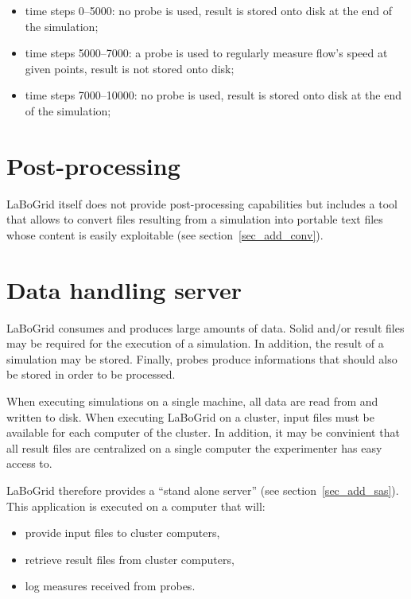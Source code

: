 \begin{itemize}
\setlength{\itemsep}{0ex}
	\item time steps 0--5000: no probe is used, result is stored onto disk at the
	end of the simulation;
	\item time steps 5000--7000: a probe is used to regularly measure flow's
	speed at given points, result is not stored onto disk;
	\item time steps 7000--10000: no probe is used, result is stored onto disk at
	the end of the simulation;
\end{itemize}


\section{Post-processing}

LaBoGrid itself does not provide post-processing capabilities but includes a
tool that allows to convert files resulting from a simulation into portable text
files whose content is easily exploitable (see section~\ref{sec_add_conv}).


\section{Data handling server}
\label{sec_feat_stand}

LaBoGrid consumes and produces large amounts of data. Solid and/or result files
may be required for the execution of a simulation. In addition, the result of a
simulation may be stored. Finally, probes produce informations that should also
be stored in order to be processed.

When executing simulations on a single machine, all data are read from and
written to disk. When executing LaBoGrid on a cluster, input files must be
available for each computer of the cluster. In addition, it may be convinient
that all result files are centralized on a single computer the experimenter has
easy access to.

LaBoGrid therefore provides a ``stand alone server'' (see
section~\ref{sec_add_sas}). This application is executed on a computer that
will:

\begin{itemize}
\setlength{\itemsep}{0ex}
	\item provide input files to cluster computers,
	\item retrieve result files from cluster computers,
	\item log measures received from probes.
\end{itemize}

